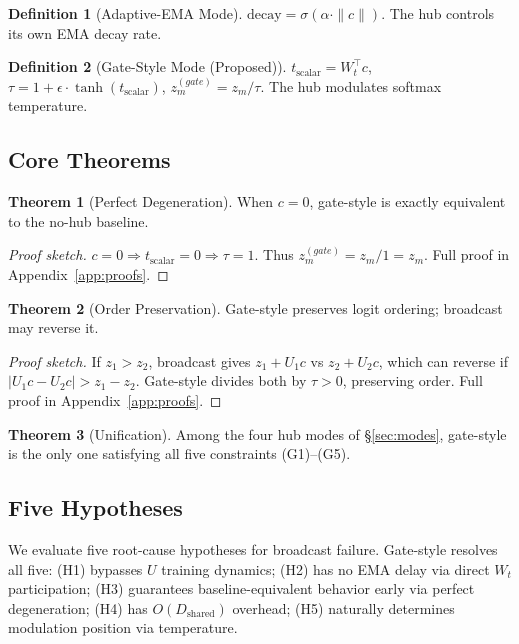 \documentclass[10pt,twoside]{article}
\theoremstyle{definition}
\newtheorem{definition}{Definition}[section]
\newtheorem{theorem}{Theorem}[section]
\begin{document}
\begin{definition}[Adaptive-EMA Mode]
    $\text{decay} = \sigma(\alpha \cdot \|c\|)$. The hub controls its own EMA decay rate.
\end{definition}

\begin{definition}[Gate-Style Mode (Proposed)]
    $t_{\text{scalar}} = W_t^\top c$, $\tau = 1 + \epsilon \cdot \tanh(t_{\text{scalar}})$, $z_m^{(gate)} = z_m / \tau$. The hub modulates softmax temperature.
\end{definition}

\subsection{Core Theorems}
\label{sec:theory}

\begin{theorem}[Perfect Degeneration]
    When $c = 0$, gate-style is exactly equivalent to the no-hub baseline.
\end{theorem}

\begin{proof}[Proof sketch]
    $c = 0 \Rightarrow t_{\text{scalar}} = 0 \Rightarrow \tau = 1$. Thus $z_m^{(gate)} = z_m / 1 = z_m$. Full proof in Appendix~\ref{app:proofs}.
\end{proof}

\begin{theorem}[Order Preservation]
    Gate-style preserves logit ordering; broadcast may reverse it.
\end{theorem}

\begin{proof}[Proof sketch]
    If $z_1 > z_2$, broadcast gives $z_1+U_1c$ vs $z_2+U_2c$, which can reverse if $|U_1c-U_2c| > z_1-z_2$. Gate-style divides both by $\tau>0$, preserving order. Full proof in Appendix~\ref{app:proofs}.
\end{proof}

\begin{theorem}[Unification]
    Among the four hub modes of \S\ref{sec:modes}, gate-style is the only one satisfying all five constraints (G1)--(G5).
\end{theorem}

\subsection{Five Hypotheses}

We evaluate five root-cause hypotheses for broadcast failure. Gate-style resolves all five: (H1) bypasses $U$ training dynamics; (H2) has no EMA delay via direct $W_t$ participation; (H3) guarantees baseline-equivalent behavior early via perfect degeneration; (H4) has $O(D_{\text{shared}})$ overhead; (H5) naturally determines modulation position via temperature.
\end{document}

